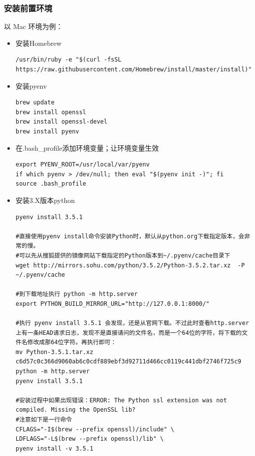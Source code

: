 \documentclass[12pt]{article}
\begin{document}
\subsubsection{安装前置环境}
以 Mac 环境为例：
\begin{itemize}
\setlength{\itemsep}{0pt}
\setlength{\parsep}{0pt}
\setlength{\parskip}{0pt}
    \item 安装Homebrew
    
\begin{lstlisting}
/usr/bin/ruby -e "$(curl -fsSL https://raw.githubusercontent.com/Homebrew/install/master/install)"
\end{lstlisting}

    \item 安装pyenv
 
\begin{lstlisting}
brew update
brew install openssl
brew install openssl-devel
brew install pyenv
\end{lstlisting}
   
    \item 在.bash\_profile添加环境变量；让环境变量生效
  
\begin{lstlisting}
export PYENV_ROOT=/usr/local/var/pyenv
if which pyenv > /dev/null; then eval "$(pyenv init -)"; fi
source .bash_profile
\end{lstlisting}
  
    \item 安装3.X版本python
    
\begin{lstlisting}
pyenv install 3.5.1

#直接使用pyenv install命令安装Python时，默认从python.org下载指定版本，会非常的慢。
#可以先从搜狐提供的镜像网站下载指定的Python版本到~/.pyenv/cache目录下
wget http://mirrors.sohu.com/python/3.5.2/Python-3.5.2.tar.xz  -P ~/.pyenv/cache

#到下载地址执行 python -m http.server
export PYTHON_BUILD_MIRROR_URL="http://127.0.0.1:8000/"

#执行 pyenv install 3.5.1 会发现，还是从官网下载。不过此时查看http.server上有一条HEAD请求日志，发现不是直接请问的文件名，而是一个64位的字符，将下载的文件名修改成那64位字符。再执行即可：
mv Python-3.5.1.tar.xz c6d57c0c366d9060ab6c0cdf889ebf3d92711d466cc0119c441dbf2746f725c9
python -m http.server
pyenv install 3.5.1

#安装过程中如果出现错误：ERROR: The Python ssl extension was not compiled. Missing the OpenSSL lib?
#注意如下是一行命令
CFLAGS="-I$(brew --prefix openssl)/include" \
LDFLAGS="-L$(brew --prefix openssl)/lib" \
pyenv install -v 3.5.1


\end{lstlisting}
\end{itemize}
\end{document}
